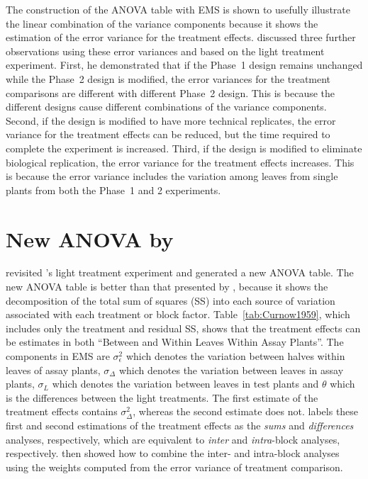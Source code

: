 \documentclass[11pt,a4paper]{article}
\begin{document}
The construction of the ANOVA table with EMS is shown to usefully illustrate the linear combination of the variance components because it shows the estimation of the error variance for the treatment effects. \cite{McIntyre1955} discussed three further observations using these error variances and based on the light treatment experiment. First, he demonstrated that if the Phase~1 design remains unchanged while the Phase~2 design is modified, the error variances for the treatment comparisons are different with different Phase~2 design. This is because the different designs cause different combinations of the variance components. Second, if the design is modified to have more technical replicates, the error variance for the treatment effects can be reduced, but the time required to complete the experiment is increased. Third, if the design is modified to eliminate biological replication, the error variance for the treatment effects increases. This is because the error variance includes the variation among leaves from single plants from both the Phase~1 and 2 experiments. 

\section{New ANOVA by \cite{Curnow1959}}
\cite{Curnow1959} revisited \citeauthor{McIntyre1955}'s light treatment experiment and generated a new ANOVA table. The new ANOVA table is better than that presented by \cite{McIntyre1955}, because it shows the decomposition of the total sum of squares (SS) into each source of variation associated with each treatment or block factor. Table~\ref{tab:Curnow1959}, which includes only the treatment and residual SS, shows that the treatment effects can be estimates in both ``Between and Within Leaves Within Assay Plants''. The components in EMS are $\sigma_{\epsilon}^2$ which denotes the variation between halves within leaves of assay plants, $\sigma_{\Delta}$ which denotes the variation between leaves in assay plants, $\sigma_{L}$ which denotes the variation between leaves in test plants and $\theta$ which is the differences between the light treatments. The first estimate of the treatment effects contains $\sigma_{\Delta}^2$, whereas the second estimate does not. \cite{Curnow1959} labels these first and second estimations of the treatment effects as the \emph{sums} and \emph{differences} analyses, respectively, which are equivalent to \emph{inter} and \emph{intra}-block analyses, respectively. \cite{Curnow1959} then showed how to combine the inter- and intra-block analyses using the weights computed from the error variance of treatment comparison. 
 
\end{document}
